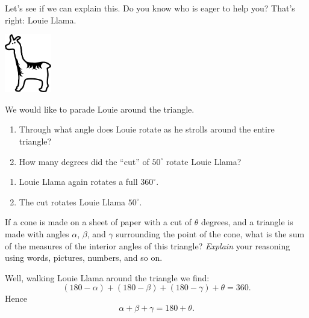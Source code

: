 \documentclass[nooutcomes,noauthor,handout]{ximera}
\begin{document}
\begin{question}
  Let's see if we can explain this. Do you know who is eager to help
you? That's right: Louie Llama.
\begin{center}
\includegraphics[height=1in]{llama.pdf}
\end{center}

We would like to parade Louie around the triangle.
\begin{enumerate}
\item Through what angle does Louie rotate as he strolls around the
  entire triangle?
\item How many degrees did the ``cut'' of $50^\circ$ rotate Louie
  Llama?
\end{enumerate}
\begin{freeResponse}
  \begin{enumerate}
  \item Louie Llama again rotates a full $360^\circ$.
  \item The cut rotates Louie Llama $50^\circ$.
  \end{enumerate}
\end{freeResponse}
\end{question}

\mynewpage


\begin{question}
If a cone is made on a sheet of paper with a cut of $\theta$ degrees,
and a triangle is made with angles $\alpha$, $\beta$, and $\gamma$
surrounding the point of the cone, what is the sum of the measures of
the interior angles of this triangle? \emph{Explain} your reasoning using words, pictures, numbers, and so on.
\begin{freeResponse}
  Well, walking Louie Llama around the triangle we find:
  \[
  (180-\alpha) + (180-\beta) + (180-\gamma) + \theta = 360.
  \]
  Hence
  \[
  \alpha + \beta + \gamma = 180 + \theta.
  \]
\end{freeResponse}
\end{question}
\end{document}
